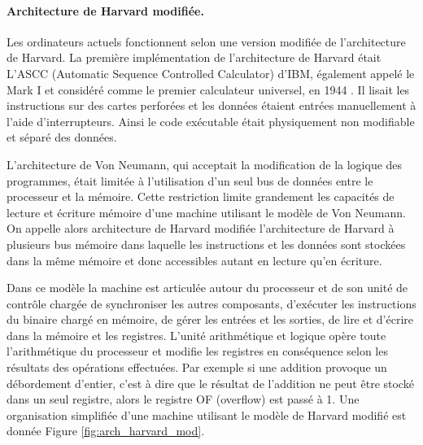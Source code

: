 \paragraph{Architecture de Harvard modifiée.}
Les ordinateurs actuels fonctionnent selon une version modifiée de l'architecture de Harvard.
La première implémentation de l'architecture de Harvard était L’ASCC (Automatic Sequence Controlled Calculator) d'IBM, également appelé le Mark I et considéré comme le premier calculateur universel, en 1944 . 
Il lisait les instructions sur des cartes perforées et les données étaient entrées manuellement à l'aide d'interrupteurs. 
Ainsi le code exécutable était physiquement non modifiable et séparé des données. 


L'architecture de Von Neumann, qui acceptait la modification de la logique des programmes, était limitée à l'utilisation d'un seul bus de données entre le processeur et la mémoire.
Cette restriction limite grandement les capacités de lecture et écriture mémoire d'une machine utilisant le modèle de Von Neumann. On appelle alors architecture de Harvard modifiée l'architecture de Harvard à plusieurs bus mémoire dans laquelle les instructions et les données sont stockées dans la même mémoire et donc accessibles autant en lecture qu'en écriture.

Dans ce modèle la machine est articulée autour du processeur et de son unité de contrôle chargée de synchroniser les autres composants, d'exécuter les instructions du binaire chargé en mémoire, de gérer les entrées et les sorties, de lire et d'écrire dans la mémoire et les registres. L'unité arithmétique et logique opère toute l'arithmétique du processeur et modifie les registres en conséquence selon les résultats des opérations effectuées. Par exemple si une addition provoque un débordement d'entier, c'est à dire que le résultat de l'addition ne peut être stocké dans un seul registre, alors le registre OF (overflow) est passé à 1.
Une organisation simplifiée d'une machine utilisant le modèle de Harvard modifié est donnée Figure \ref{fig:arch_harvard_mod}.

